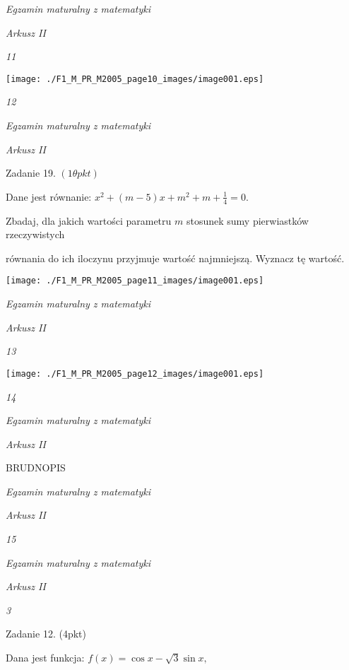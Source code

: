\documentclass[a4paper,12pt]{article}
\begin{document}
{\it Egzamin maturalny z matematyki}

{\it Arkusz II}

{\it 11}
\begin{center}
\texttt{[image: ./F1\_M\_PR\_M2005\_page10\_images/image001.eps]}
\end{center}




{\it 12}

{\it Egzamin maturalny z matematyki}

{\it Arkusz II}

Zadanie 19. $(1\theta pkt)$

Dane jest równanie: $x^{2}+(m-5)x+m^{2}+m+\displaystyle \frac{1}{4}=0.$

Zbadaj, dla jakich wartości parametru $m$ stosunek sumy pierwiastków rzeczywistych

równania do ich iloczynu przyjmuje wartość najmniejszą. Wyznacz tę wartość.
\begin{center}
\texttt{[image: ./F1\_M\_PR\_M2005\_page11\_images/image001.eps]}
\end{center}




{\it Egzamin maturalny z matematyki}

{\it Arkusz II}

{\it 13}
\begin{center}
\texttt{[image: ./F1\_M\_PR\_M2005\_page12\_images/image001.eps]}
\end{center}




{\it 14}

{\it Egzamin maturalny z matematyki}

{\it Arkusz II}

BRUDNOPIS





{\it Egzamin maturalny z matematyki}

{\it Arkusz II}

{\it 15}





{\it Egzamin maturalny z matematyki}

{\it Arkusz II}

{\it 3}

Zadanie 12. (4pkt)

Dana jest funkcja: $f(x)=\cos x-\sqrt{3}\sin x,$
\end{document}

